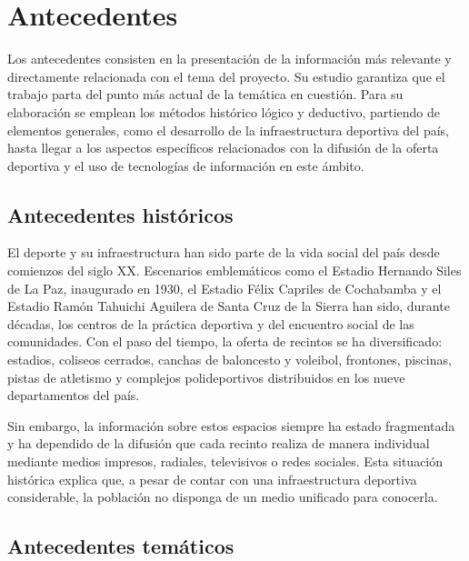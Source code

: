 
\section{Antecedentes}

Los antecedentes consisten en la presentaci\'on de la informaci\'on m\'as
relevante y directamente relacionada con el tema del proyecto. Su estudio
garantiza que el trabajo parta del punto m\'as actual de la tem\'atica en
cuesti\'on. Para su elaboraci\'on se emplean los m\'etodos hist\'orico l\'ogico y
deductivo, partiendo de elementos generales, como el desarrollo de la
infraestructura deportiva del pa\'is, hasta llegar a los aspectos espec\'ificos
relacionados con la difusi\'on de la oferta deportiva y el uso de tecnolog\'ias de
informaci\'on en este \'ambito.

\subsection{Antecedentes hist\'oricos}

El deporte y su infraestructura han sido parte de la vida social del pa\'is
desde comienzos del siglo XX. Escenarios emblem\'aticos como el Estadio Hernando
Siles de La Paz, inaugurado en 1930, el Estadio F\'elix Capriles de
Cochabamba y el Estadio Ram\'on Tahuichi Aguilera de Santa Cruz de la Sierra
han sido, durante d\'ecadas, los centros de la pr\'actica deportiva y del
encuentro social de las comunidades. Con el paso del tiempo, la oferta de
recintos se ha diversificado: estadios, coliseos cerrados, canchas de
baloncesto y voleibol, frontones, piscinas, pistas de atletismo y complejos
polideportivos distribuidos en los nueve departamentos del pa\'is.

Sin embargo, la informaci\'on sobre estos espacios siempre ha estado
fragmentada y ha dependido de la difusi\'on que cada recinto realiza de manera
individual mediante medios impresos, radiales, televisivos o redes sociales.
Esta situaci\'on hist\'orica explica que, a pesar de contar con una
infraestructura deportiva considerable, la poblaci\'on no disponga de un medio
unificado para conocerla.

\subsection{Antecedentes tem\'aticos}

